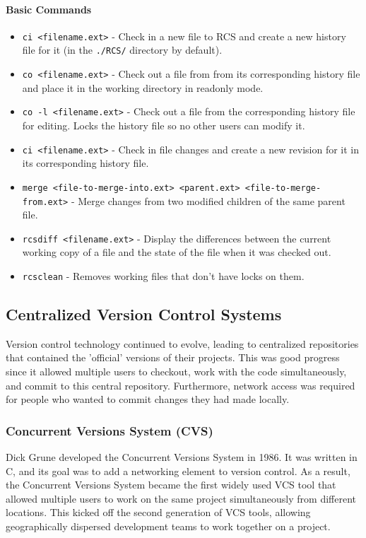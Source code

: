 \paragraph{Basic Commands}

\begin{itemize}
    \item \lstinline{ci <filename.ext>} - Check in a new file to RCS and create a new history file for it (in the \lstinline{./RCS/} directory by default).
    \item \lstinline{co <filename.ext>} - Check out a file from from its corresponding history file and place it in the working directory in readonly mode.
    \item \lstinline{co -l <filename.ext>} - Check out a file from the corresponding history file for editing. Locks the history file so no other users can modify it.
    \item \lstinline{ci <filename.ext>} - Check in file changes and create a new revision for it in its corresponding history file.
    \item \lstinline{merge <file-to-merge-into.ext> <parent.ext> <file-to-merge-from.ext>} - Merge changes from two modified children of the same parent file.
    \item \lstinline{rcsdiff <filename.ext>} - Display the differences between the current working copy of a file and the state of the file when it was checked out.
    \item \lstinline{rcsclean} - Removes working files that don't have locks on them.
\end{itemize}

\subsection{Centralized Version Control Systems}
Version control technology continued to evolve, leading to centralized repositories that contained the 'official' versions of their projects. This was good progress since it allowed multiple users to checkout, work with the code simultaneously, and commit to this central repository. Furthermore, network access was required for people who wanted to commit changes they had made locally.
\subsubsection{Concurrent Versions System (CVS)}
Dick Grune developed the Concurrent Versions System in 1986. It was written in C, and its goal was to add a networking element to version control. As a result, the Concurrent Versions System became the first widely used VCS tool that allowed multiple users to work on the same project simultaneously from different locations. This kicked off the second generation of VCS tools, allowing geographically dispersed development teams to work together on a project.

